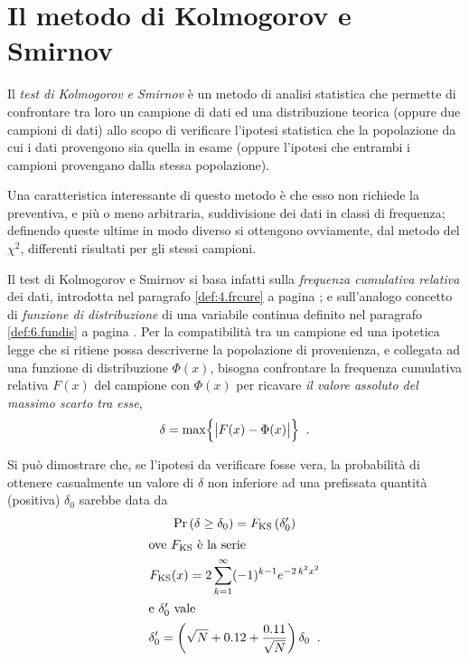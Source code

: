 \section{Il metodo di Kolmogorov e Smirnov}%
%
%
%
Il \emph{test di Kolmogorov e Smirnov} \`e un metodo di
analisi statistica che permette di confrontare tra loro un
campione di dati ed una distribuzione teorica (oppure due
campioni di dati) allo scopo di verificare l'ipotesi
statistica che la popolazione da cui i dati provengono sia
quella in esame (oppure l'ipotesi che entrambi i campioni
provengano dalla stessa popolazione).

Una caratteristica interessante di questo metodo \`e che
esso non richiede la preventiva, e pi\`u o meno arbitraria,
suddivisione dei dati in classi di frequenza; definendo
queste ultime in modo diverso si ottengono ovviamente, dal
metodo del $\chi^2$, differenti risultati per gli stessi
campioni.

Il test di Kolmogorov e Smirnov si basa infatti sulla
\emph{frequenza cumulativa relativa} dei dati, introdotta
nel paragrafo \ref{def:4.frcure} a pagina
\pageref{def:4.frcure}; e sull'analogo concetto di
\emph{funzione di distribuzione} di una variabile continua
definito nel paragrafo \ref{def:6.fundis} a pagina
\pageref{def:6.fundis}.  Per la compatibilit\`a tra un
campione ed una ipotetica legge che si ritiene possa
descriverne la popolazione di provenienza, e collegata ad
una funzione di distribuzione $\Phi(x)$, bisogna confrontare
la frequenza cumulativa relativa $F(x)$ del campione con
$\Phi(x)$ per ricavare \emph{il valore assoluto del massimo
  scarto tra esse},
\begin{equation*}
  \delta = \max \Bigl\{ \bigl| F(x) - \Phi(x) \bigr|
    \Bigr\} \;\; .
\end{equation*}

Si pu\`o dimostrare che, se l'ipotesi da verificare fosse
vera, la probabilit\`a di ottenere casualmente un valore di
$\delta$ non inferiore ad una prefissata quantit\`a
(positiva) $\delta_0$ sarebbe data da
\begin{gather}
  \Pr \left( \delta \ge \delta_0 \right) = F_{\mathrm{KS}}
    \left( \delta'_0 \right) \notag \\
  \intertext{ove $F_{\mathrm{KS}}$ \`e la serie}
  F_{\mathrm{KS}} (x) = 2 \sum_{k=1}^\infty ( -1 )^{k-1}
    e^{-2 \, k^2 x^2} \label{eq:12.kosmfu} \\
  \intertext{e $\delta'_0$ vale}
  \delta'_0 = \left( \sqrt{N} + 0.12 +
    \frac{0.11}{\sqrt{N}} \right) \delta_0 \;\; .
    \label{eq:12.kosmva}
\end{gather}

